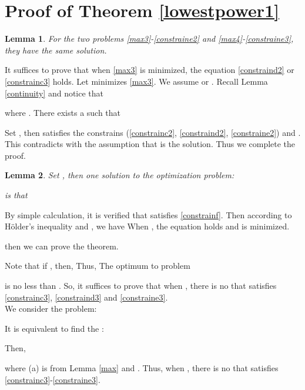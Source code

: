 \documentclass[12pt, draftclsnofoot, journal, letterpaper, onecolumn]{IEEEtran}
\newtheorem{lemma}{Lemma}[section]
\begin{document}
\section{Proof of Theorem \ref{lowestpower1}}\label{lowestpower1proof}
\begin{lemma}\label{eq}
For the two problems \eqref{max3}-\eqref{constraine2} and \eqref{max4}-\eqref{constraine3}, they have the same solution.\\

\end{lemma}
\begin{IEEEproof}
It suffices to prove that when \eqref{max3} is minimized, the equation \eqref{constraind2} or \eqref{constrainc3} holds. Let  minimizes \eqref{max3}. We assume  or . Recall Lemma \ref{continuity} and notice that

where .
There exists a  such that

Set , then  satisfies the constrains (\eqref{constrainc2}, \eqref{constraind2}, \eqref{constraine2}) and . This contradicts with the assumption that  is the solution. Thus we complete the proof.
\end{IEEEproof}
\begin{lemma}
Set , then one solution to the optimization problem:

is that 
\end{lemma}
\begin{IEEEproof}
By simple calculation, it is verified that  satisfies \eqref{constrainf}.
Then according to H\"{o}lder's inequality\cite{probability} and , we have  When , the equation holds and  is minimized.
\end{IEEEproof}
then we can prove the theorem.
\begin{IEEEproof}
Note that if , then,  Thus,
The optimum to problem

is no less than . So, it suffices to prove that when , there is no  that satisfies \eqref{constrainc3}, \eqref{constraind3} and \eqref{constraine3}.\\
We consider the problem:

It is equivalent to find the :

Then,

where (a) is from Lemma \ref{max} and .
Thus, when , there is no  that satisfies \eqref{constrainc3}-\eqref{constraine3}.
\end{IEEEproof}
\end{document}
